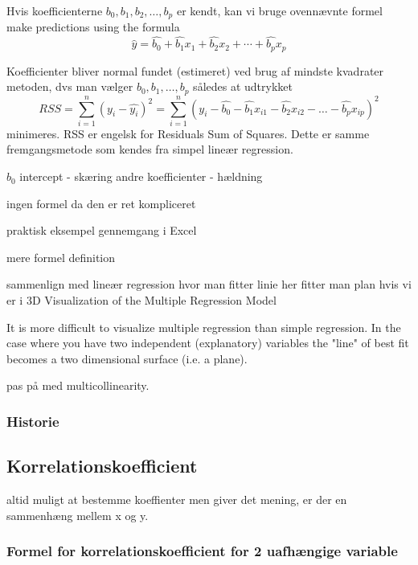 Hvis koefficienterne \(b_0,b_1,b_2,\ldots,b_p\) er kendt, kan vi bruge ovennævnte formel
make predictions using the formula
\begin{displaymath}
\hat{y} = \hat{b_0} + \hat{b_1}x_1 + \hat{b_2}x_2 + \cdots + \hat{b_p}x_p
\end{displaymath}

Koefficienter bliver normal fundet (estimeret) ved brug af mindste kvadrater metoden, dvs man vælger \(b_0, b_1, \ldots , b_p\)  således at udtrykket
\begin{displaymath}
  RSS = \sum^n_{i=1} (y_i - \hat{y_i})^2 = \sum^n_{i=1} (y_i - \hat{b_0} - \hat{b_1}x_{i1} - \hat{b_2} x_{i2} - \dots - \hat{b_p} x_{ip})^2
\end{displaymath}
minimeres. RSS er engelsk for Residuals Sum of Squares. Dette er samme fremgangsmetode som kendes fra simpel lineær regression.

$b_0$ intercept - skæring
andre koefficienter - hældning

ingen formel da den er ret kompliceret

praktisk eksempel gennemgang i Excel

mere formel definition

sammenlign med lineær regression
hvor man fitter linie
her fitter man plan hvis vi er i 3D
Visualization of the Multiple Regression Model

It is more difficult to visualize multiple regression than simple regression.  In the case where you have two independent (explanatory) variables the "line" of best fit becomes a two dimensional surface (i.e. a plane).



pas på med multicollinearity.

\subsubsection{Historie}


\subsection{Korrelationskoefficient}
altid muligt at bestemme koeffienter men giver det mening,
er der en sammenhæng mellem x og y.

\subsubsection{Formel for korrelationskoefficient for 2 uafhængige variable}

